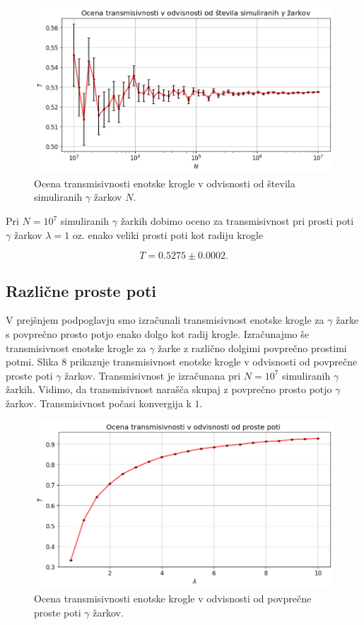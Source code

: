 \documentclass[slovene,11pt,a4paper]{article}
\begin{document}
\begin{figure}[h!]
\centering
\includegraphics[width=13cm]{gama1.png}
\caption{Ocena transmisivnosti enotske krogle v odvisnosti od števila simuliranih $\gamma$ žarkov $N$.}
\end{figure}
Pri $N=10^7$ simuliranih $\gamma$ žarkih dobimo oceno za transmisivnost pri prosti poti $\gamma$ žarkov $\lambda=1$ oz. enako veliki prosti poti kot radiju krogle

\[
T = 0.5275 \pm 0.0002.
\]

\subsection{Različne proste poti}

V prejšnjem podpoglavju smo izračunali transmisivnost enotske krogle za $\gamma$ žarke s povprečno prosto potjo enako dolgo kot radij krogle. Izračunajmo še transmisivnost enotske krogle za $\gamma$ žarke z različno dolgimi povprečno prostimi potmi. Slika 8 prikazuje transmisivnost enotske krogle v odvisnosti od povprečne proste poti $\gamma$ žarkov. Transmisivnost je izračunana pri $N=10^7$ simuliranih $\gamma$ žarkih. Vidimo, da transmisivnost narašča skupaj z povprečno prosto potjo $\gamma$ žarkov. Transmisivnost počasi konvergija k $1$.

\newpage

\begin{figure}[h!]
\centering
\includegraphics[width=13cm]{gama2.png}
\caption{Ocena transmisivnosti enotske krogle v odvisnosti od povprečne proste poti $\gamma$ žarkov.}
\end{figure}
\end{document}
